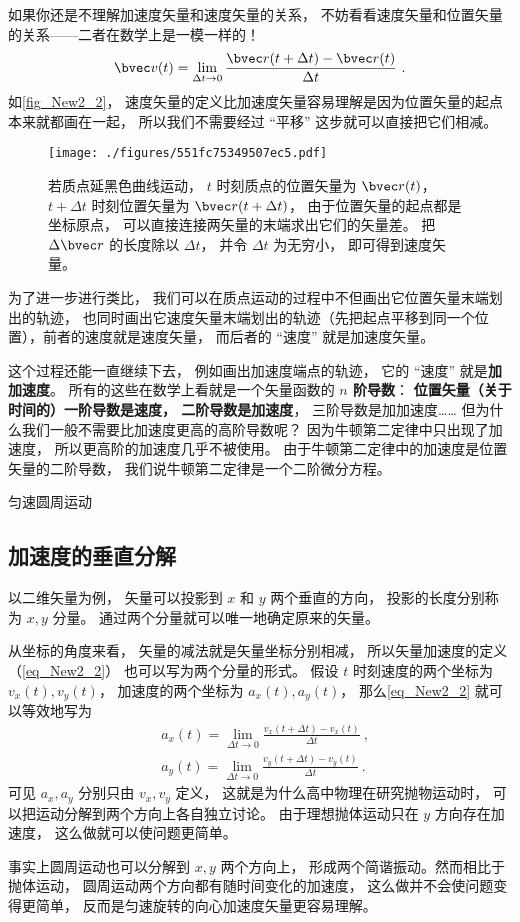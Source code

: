 如果你还是不理解加速度矢量和速度矢量的关系， 不妨看看速度矢量和位置矢量的关系——二者在数学上是一模一样的！
\begin{equation}
\bvec v(t) = \lim_{\Delta t\to 0}\frac{\bvec r(t+\Delta t) - \bvec r(t)}{\Delta t}~.
\end{equation}
如\autoref{fig_New2_2}， 速度矢量的定义比加速度矢量容易理解是因为位置矢量的起点本来就都画在一起， 所以我们不需要经过 “平移” 这步就可以直接把它们相减。
\begin{figure}[ht]
\centering
\texttt{[image: ./figures/551fc75349507ec5.pdf]}
\caption{若质点延黑色曲线运动， $t$ 时刻质点的位置矢量为 $\bvec r(t)$，$t+\Delta t$ 时刻位置矢量为 $\bvec r(t+\Delta t)$， 由于位置矢量的起点都是坐标原点， 可以直接连接两矢量的末端求出它们的矢量差。 把 $\Delta \bvec r$ 的长度除以 $\Delta t$， 并令 $\Delta t$ 为无穷小， 即可得到速度矢量。} \label{fig_New2_2}
\end{figure}

为了进一步进行类比， 我们可以在质点运动的过程中不但画出它位置矢量末端划出的轨迹， 也同时画出它速度矢量末端划出的轨迹（先把起点平移到同一个位置），前者的速度就是速度矢量， 而后者的 “速度” 就是加速度矢量。

这个过程还能一直继续下去， 例如画出加速度端点的轨迹， 它的 “速度” 就是\textbf{加加速度}。 所有的这些在数学上看就是一个矢量函数的\textbf{ $n$ 阶导数}： \textbf{位置矢量（关于时间的）一阶导数是速度， 二阶导数是加速度}， 三阶导数是加加速度…… 但为什么我们一般不需要比加速度更高的高阶导数呢？ 因为牛顿第二定律中只出现了加速度， 所以更高阶的加速度几乎不被使用。 由于牛顿第二定律中的加速度是位置矢量的二阶导数， 我们说牛顿第二定律是一个二阶微分方程。

\begin{example}{匀速圆周运动}
\end{example}

\subsection{加速度的垂直分解}

以二维矢量为例， 矢量可以投影到 $x$ 和 $y$ 两个垂直的方向， 投影的长度分别称为 $x, y$ 分量。 通过两个分量就可以唯一地确定原来的矢量。

从坐标的角度来看， 矢量的减法就是矢量坐标分别相减， 所以矢量加速度的定义（\autoref{eq_New2_2}） 也可以写为两个分量的形式。 假设 $t$ 时刻速度的两个坐标为 $v_x(t), v_y(t)$， 加速度的两个坐标为 $a_x(t), a_y(t)$， 那么\autoref{eq_New2_2} 就可以等效地写为
\begin{equation}
\begin{aligned}
&a_x(t) = \lim_{\Delta t\to 0}\frac{v_x(t+\Delta t) - v_x(t)}{\Delta t}~,\\
&a_y(t) = \lim_{\Delta t\to 0}\frac{v_y(t+\Delta t) - v_y(t)}{\Delta t}~.
\end{aligned}
\end{equation}
可见 $a_x,a_y$ 分别只由 $v_x,v_y$ 定义， 这就是为什么高中物理在研究抛物运动时， 可以把运动分解到两个方向上各自独立讨论。 由于理想抛体运动只在 $y$ 方向存在加速度， 这么做就可以使问题更简单。

事实上圆周运动也可以分解到 $x,y$ 两个方向上， 形成两个简谐振动。然而相比于抛体运动， 圆周运动两个方向都有随时间变化的加速度， 这么做并不会使问题变得更简单， 反而是匀速旋转的向心加速度矢量更容易理解。
